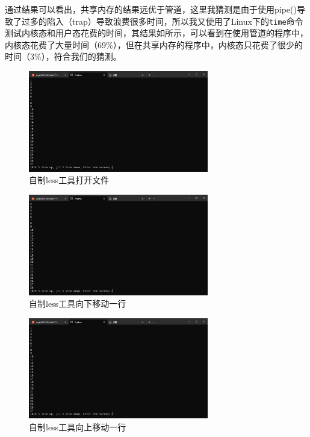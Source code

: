 \documentclass[lang=cn,a4paper,newtx]{elegantpaper}
\begin{document}
通过结果可以看出，共享内存的结果远优于管道，这里我猜测是由于使用pipe()导致了过多的陷入（trap）导致浪费很多时间，所以我又使用了Linux下的\verb|time|命令测试内核态和用户态花费的时间，其结果如所示，可以看到在使用管道的程序中，内核态花费了大量时间（69\%），但在共享内存的程序中，内核态只花费了很少的时间（3\%），符合我们的猜测。
\begin{figure}[!htb]
    \centering
    \includegraphics[width=0.7\textwidth]{image/less_open.png}
    \caption{自制less工具打开文件}
    \label{fig:less_open}
\end{figure}
\begin{figure}[!htb]
    \centering
    \includegraphics[width=0.7\textwidth]{image/less_j.png}
    \caption{自制less工具向下移动一行}
    \label{fig:less_j}
\end{figure}
\begin{figure}[!htb]
    \centering
    \includegraphics[width=0.7\textwidth]{image/less_k.png}
    \caption{自制less工具向上移动一行}
    \label{fig:less_k}
\end{figure}
\end{document}
